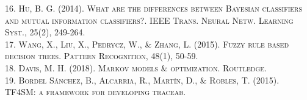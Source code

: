 \documentclass{article}
\begin{document}
\begin{thebibliography}{X}
\textsc{16. Hu, B. G. (2014). What are the differences between Bayesian classifiers and mutual information classifiers?. IEEE Trans. Neural Netw. Learning Syst., 25(2), 249-264.}\\
\textsc{17. Wang, X., Liu, X., Pedrycz, W., \& Zhang, L. (2015). Fuzzy rule based decision trees. Pattern Recognition, 48(1), 50-59.}\\
\textsc{18. Davis, M. H. (2018). Markov models \& optimization. Routledge.}\\
\textsc{19. Bordel Sánchez, B., Alcarria, R., Martín, D., \& Robles, T. (2015). TF4SM: a framework for developing traceab.} \\
\end{thebibliography}
\end{document}
